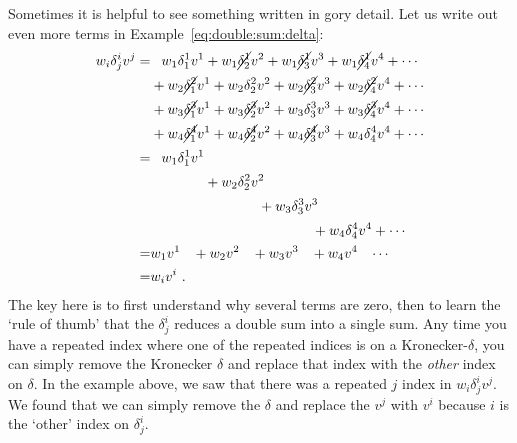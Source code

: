 \begin{subappendices}
\begin{example}
Sometimes it is helpful to see something written in gory detail. Let us write out even more terms in Example~\ref{eq:double:sum:delta}:
\begin{align}
    w_i \delta^i_j v^j = 
    &
    \pp w_1 \delta^1_1 v^1 
    + w_1 \cancel{\delta^1_2} v^2 
    + w_1 \cancel{\delta^1_3} v^3 
    + w_1 \cancel{\delta^1_4} v^4 
    + \cdots 
    \\
    & 
    + w_2 \cancel{\delta^2_1} v^1
    + w_2 {\delta^2_2} v^2 
    + w_2 \cancel{\delta^2_3} v^3 
    + w_2 \cancel{\delta^2_4} v^4 
    + \cdots 
    \\    & 
    + w_3 \cancel{\delta^3_1} v^1
    + w_3 \cancel{\delta^3_2} v^2 
    + w_3 {\delta^3_3} v^3 
    + w_3 \cancel{\delta^3_4} v^4 
    + \cdots 
    \\    & 
    + w_4 \cancel{\delta^4_1} v^1
    + w_4 \cancel{\delta^4_2} v^2 
    + w_4 \cancel{\delta^4_3} v^3 
    + w_4 {\delta^4_4} v^4 
    + \cdots 
    \\
    = &
    \pp w_1 \delta^1_1 v^1 
    \phantom{+ w_1 \cancel{\delta^1_2} v^2 }
    \phantom{+ w_1 \cancel{\delta^1_3} v^3 }
    \phantom{+ w_1 \cancel{\delta^1_4} v^4 }
    \phantom{+ \cdots }
    \\
    & 
    \phantom{+ w_2 \cancel{\delta^2_1} v^1}
    + w_2 {\delta^2_2} v^2 
    \phantom{+ w_2 \cancel{\delta^2_3} v^3 }
    \phantom{+ w_2 \cancel{\delta^2_4} v^4 }
    \phantom{+ \cdots }
    \\    & 
    \phantom{+ w_3 \cancel{\delta^3_1} v^1}
    \phantom{+ w_3 \cancel{\delta^3_2} v^2 }
    + w_3 {\delta^3_3} v^3 
    \phantom{+ w_3 \cancel{\delta^3_4} v^4 }
    \phantom{+ \cdots }
    \\    & 
    \phantom{+ w_4 \cancel{\delta^4_1} v^1}
    \phantom{+ w_4 \cancel{\delta^4_2} v^2 }
    \phantom{+ w_4 \cancel{\delta^4_3} v^3 }
    + w_4 {\delta^4_4} v^4 
    + \cdots 
    \\
    =& w_1v^1\phantom{\delta^i_j} + w_2 v^2\phantom{\delta^i_j} + w_3 v^3\phantom{\delta^i_j} + w_4 v^4\phantom{\delta^i_j} \cdots 
    \\=& w_iv^i 
    \ .
\end{align}
The key here is to first understand why several terms are zero, then to learn the `rule of thumb' that the $\delta^i_j$ reduces a double sum into a single sum. Any time you have a repeated index where one of the repeated indices is on a Kronecker-$\delta$, you can simply remove the Kronecker $\delta$ and replace that index with the \emph{other} index on $\delta$. In the example above, we saw that there was a repeated $j$ index in $w_i \delta^i_j v^j$. We found that we can simply remove the $\delta$ and replace the $v^j$ with $v^i$ because $i$ is the `other' index on $\delta^i_j$.
\end{example}


\end{subappendices}
